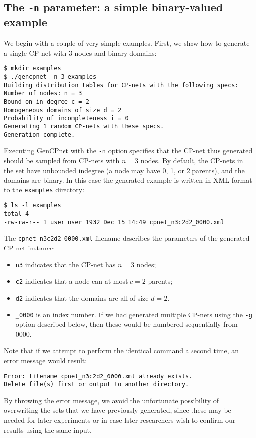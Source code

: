 \documentclass{article}
\begin{document}
\subsection{The \texttt{-n} parameter: a simple binary-valued example}

We begin with a couple of very simple examples.  First, we show how to
generate a single CP-net with 3 nodes and binary domains:
\begin{verbatim}
$ mkdir examples
$ ./gencpnet -n 3 examples
Building distribution tables for CP-nets with the following specs:
Number of nodes: n = 3
Bound on in-degree c = 2
Homogeneous domains of size d = 2
Probability of incompleteness i = 0
Generating 1 random CP-nets with these specs.
Generation complete.
\end{verbatim}

Executing GenCPnet with the \verb|-n| option specifies that the CP-net
thus generated should be sampled from CP-nets with $n=3$ nodes.  By
default, the CP-nets in the set have unbounded indegree (a node may
have 0, 1, or 2 parents), and the domains are binary.  In this case
the generated example is written in XML format to the \verb|examples|
directory:
\begin{verbatim}
$ ls -l examples
total 4
-rw-rw-r-- 1 user user 1932 Dec 15 14:49 cpnet_n3c2d2_0000.xml
\end{verbatim}
The \verb|cpnet_n3c2d2_0000.xml| filename describes the parameters of
the generated CP-net instance:
\begin{itemize}
\item \verb|n3| indicates that the CP-net has $n=3$ nodes;
\item \verb|c2| indicates that a node can at most $c=2$ parents;
\item \verb|d2| indicates that the domains are all of size $d=2$. 
\item \verb|_0000| is an index number.  If we had generated multiple
  CP-nets using the \verb|-g| option described below, then these would
  be numbered sequentially from 0000.
\end{itemize}

Note that if we attempt to perform the identical command a second
time, an error message would result:
\begin{verbatim}
Error: filename cpnet_n3c2d2_0000.xml already exists.
Delete file(s) first or output to another directory.
\end{verbatim}
By throwing the error message, we avoid the unfortunate possibility of
overwriting the sets that we have previously generated, since these
may be needed for later experiments or in case later researchers wish
to confirm our results using the same input.
\end{document}

